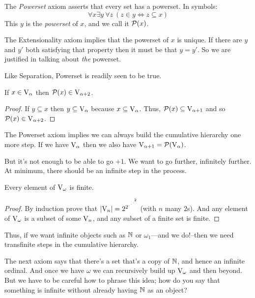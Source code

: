 \documentclass[10pt]{amsart}
\begin{document}
\begin{definition}
The \emph{Powerset} axiom asserts that every set has a powerset. In symbols:
\[
\tag{Powerset} \forall x \exists y\ \forall z\ (z \in y \iff z \subseteq x)
\]
This $y$ is the \emph{powerset} of $x$, and we call it $\mathcal{P}(x)$.
\end{definition}

\begin{remark}
The Extensionality axiom implies that the powerset of $x$ is unique. If there are $y$ and $y'$ both satisfying that property then it must be that $y = y'$. So we are justified in talking about \emph{the} powerset.
\end{remark}

Like Separation, Powerset is readily seen to be true.

\begin{proposition}
If $x \in \mathrm{V}_\alpha$ then $\mathcal{P}(x) \in \mathrm{V}_{\alpha+2}$.
\end{proposition}

\begin{proof}
If $y \subseteq x$ then $y \subseteq \mathrm{V}_\alpha$ because $x \subseteq \mathrm{V}_\alpha$. Thus, $\mathcal{P}(x) \subseteq \mathrm{V}_{\alpha+1}$ and so $\mathcal{P}(x) \in \mathrm{V}_{\alpha+2}$.
\end{proof}

The Powerset axiom implies we can always build the cumulative hierarchy one more step. If we have $\mathrm{V}_\alpha$ then we also have $\mathrm{V}_{\alpha + 1} = \mathcal{P}(\mathrm{V}_\alpha)$.

But it's not enough to be able to go $+1$. We want to go further, infinitely further.
At minimum, there should be an infinite step in the process. 

\begin{proposition}
Every element of $\mathrm{V}_\omega$ is finite.
\end{proposition}

\begin{proof}
By induction prove that $\left\lvert \mathrm{V}_n \right\rvert = 2^{2^{{\iddots^2}}}$ (with $n$ many $2$s). And any element of $\mathrm{V}_\omega$ is a subset of some $\mathrm{V}_n$, and any subset of a finite set is finite.
\end{proof}

Thus, if we want infinite objects such as $\mathbb{N}$ or $\omega_1$---and we do!--then we need transfinite steps in the cumulative hierarchy.

The next axiom says that there's a set that's a copy of $\mathbb{N}$, and hence an infinite ordinal. And once we have $\omega$ we can recursively build up $\mathrm{V}_\omega$ and then beyond. But we have to be careful how to phrase this idea; how do you say that something is infinite without already having $\mathbb{N}$ as an object?
\end{document}
